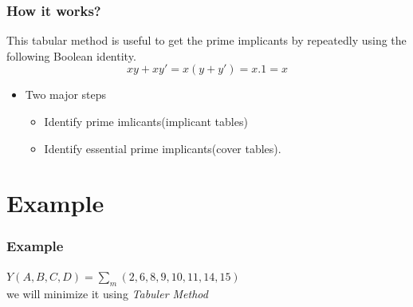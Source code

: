 \documentclass{beamer}
\begin{document}
\begin{frame}
    \frametitle{How it works?}
    This tabular method is useful to get the prime implicants by repeatedly using the following Boolean identity.
    \begin{equation*}
        xy+xy' = x(y+y') = x.1 = x
    \end{equation*}
    \begin{itemize}
        \item Two major steps
        \begin{itemize}
            \item Identify prime imlicants(implicant tables)
            \item Identify essential prime implicants(cover tables).
        \end{itemize}
    \end{itemize}
\end{frame}


\section{Example}

\begin{frame}
    \frametitle{Example}
    \begin{example}
        \begin{math}
            Y(A,B,C,D) = \sum_{m} (2,6,8,9,10,11,14,15)
        \end{math}
        \\
        \alert{we will minimize it using \textit{Tabuler Method}}
    \end{example}
\end{frame}
\end{document}
